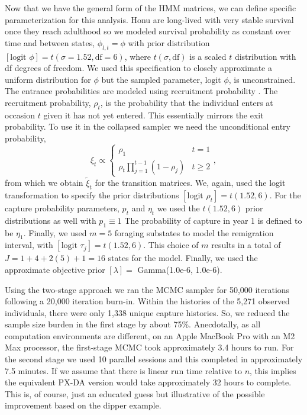 \documentclass[12pt]{article}
\begin{document}
Now that we have the general form of the HMM matrices, we can define specific parameterization for this analysis. Honu are long-lived with very stable survival once they reach adulthood \citep{PiacenzaEtAl2016a} so we modeled survival probability as constant over time and between states, $\phi_{l,t} = \phi$ with prior distribution $[\text{logit }\phi] = t(\sigma=1.52,\text{df}=6)$, where $t(\sigma,\text{df})$ is a scaled $t$ distribution with df degrees of freedom. We used this specification to closely approximate a uniform distribution for $\phi$ but the sampled parameter, $\text{logit }\phi$, is unconstrained.
The entrance probabilities are modeled using recruitment probability \citep{Royle:2008kx}. The recruitment probability, $\rho_t$, is the probability that the individual enters at occasion $t$ given it has not yet entered. This essentially mirrors the exit probability. To use it in the collapsed sampler we need the unconditional entry probability,
\[
\xi_t \propto \left\{
\begin{array}{ll}
\rho_1 & t=1 \\
\rho_t \prod_{j=1}^{t-1} (1-\rho_j) & t \ge 2
\end{array}, \right.
\]
from which we obtain $\tilde{\xi}_t$ for the transition matrices. We, again, used the logit transformation to specify the prior distributions $[\text{logit }\rho_t] = t(1.52,6)$. For the capture probability parameters, $p_t$ and $\eta_t$ we used the $t(1.52,6)$ prior distributions as well with $p_1 \equiv 1$ The probability of capture in year 1 is defined to be $\eta_1$. Finally, we used $m=5$ foraging substates to model the remigration interval, with $[\text{logit }\tau_j] = t(1.52,6)$. This choice of $m$ results in a total of $J=1+4+2(5)+1 =16$ states for the model. Finally, we used the approximate objective prior $[\lambda]=$ Gamma(1.0e-6, 1.0e-6).

Using the two-stage approach we ran the MCMC sampler for 50,000 iterations following a 20,000 iteration burn-in. Within the histories of the 5,271 observed individuals, there were only 1,338 unique capture histories. So, we reduced the sample size burden in the first stage by about 75\%. Anecdotally, as all computation environments are different, on an Apple MacBook Pro with an M2 Max processor, the first-stage MCMC took approximately 3.4 hours to run. For the second stage we used 10 parallel sessions and this completed in approximately 7.5 minutes. If we assume that there is linear run time relative to $n$, this implies the equivalent PX-DA version would take approximately 32 hours to complete. This is, of course, just an educated guess but illustrative of the possible improvement based on the dipper example.
\end{document}
